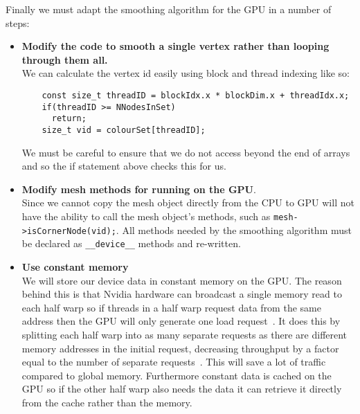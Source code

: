 Finally we must adapt the smoothing algorithm for the GPU in a number of steps:
\begin{itemize}
  \item \textbf{Modify the code to smooth a single vertex rather than looping through them all.} \\
        We can calculate the vertex id easily using block and thread indexing like so:
        \begin{verbatim}
    const size_t threadID = blockIdx.x * blockDim.x + threadIdx.x;
    if(threadID >= NNodesInSet)
      return;
    size_t vid = colourSet[threadID];
        \end{verbatim}
        We must be careful to ensure that we do not access beyond the end of arrays and so the if statement above checks this for us.
  \item \textbf{Modify mesh methods for running on the GPU}. \\
        Since we cannot copy the mesh object directly from the CPU to GPU will not have the ability to call the mesh object's methods, such as \verb!mesh->isCornerNode(vid);!. All methods needed by the smoothing algorithm must be declared as \verb!__device__! methods and re-written.
  \item \textbf{Use constant memory}\\
        We will store our device data in constant memory on the GPU. The reason behind this is that Nvidia hardware can broadcast a single memory read to each half warp so if threads in a half warp request data from the same address then the GPU will only generate one load request~\cite{const_mem}. It does this by splitting each half warp into as many separate requests as there are different memory addresses in the initial request, decreasing throughput by a factor equal to the number of separate requests~\cite{half_warp_broadcast}. This will save a lot of traffic compared to global memory.
        Furthermore constant data is cached on the GPU so if the other half warp also needs the data it can retrieve it directly from the cache rather than the memory.

\end{itemize}

